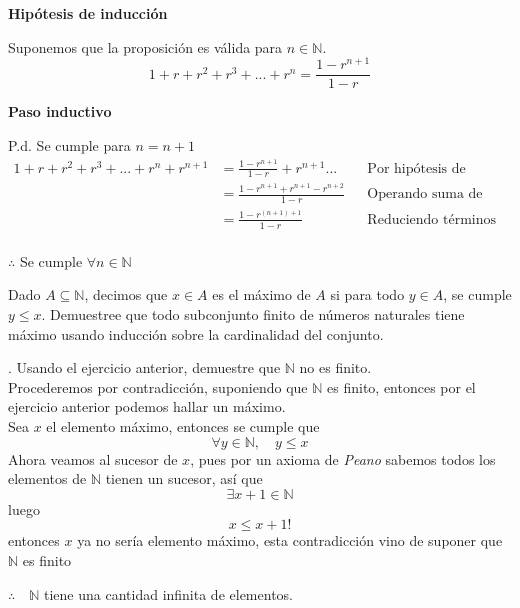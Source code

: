 \documentclass[letterpaper]{article}
\newcommand{\N}{\mathds{N}}
\renewcommand{\*}{\cdot}
\theoremstyle{definition}
\begin{document}
\begin{flushright}
	\textbf{Hipótesis de inducción}
\end{flushright}
Suponemos que la proposición es válida para $n \in \mathbb{N}.$\\
$$1+r+r^2+r^3+...+r^n=\frac{1-r^{n+1}}{1-r}$$
\begin{flushright}
\textbf{Paso inductivo}
\end{flushright}
P.d. Se cumple para $ n=n+1 $
\begin{align*}
	1+r+r^2+r^3+...+r^n+r^{n+1}&=\frac{1-r^{n+1}}{1-r}+r^{n+1}...&& \text{Por hipótesis de inducción}\\
	&=\frac{1-r^{n+1}+r^{n+1}-r^{n+2}}{1-r} &&\text{Operando suma de fracciones}\\
	&=\frac{1-r^{(n+1)+1}}{1-r} && \text{Reduciendo términos}\\
\end{align*}
\begin{center}
	$\therefore$ Se  cumple  $\forall{n} \in \mathbb{N}$\\
\end{center}



\noindent Dado $ A \subseteq \N $, decimos que $ x \in A $ es el máximo de $ A $ si para todo $ y \in A $, se cumple $ y \leq x $. Demuestree que todo subconjunto finito de números naturales tiene máximo usando inducción sobre la cardinalidad del conjunto.

. Usando el ejercicio anterior, demuestre que $ \N $ no es finito.\\

Procederemos por contradicción, suponiendo que $ \N $ es finito, entonces por el ejercicio anterior podemos hallar un máximo. \\
Sea $ x  $ el elemento máximo, entonces se cumple que $$ \forall y \in \N , \quad y \leq x $$ Ahora veamos al sucesor de $ x $, pues por un axioma de \textit{Peano} sabemos todos los elementos de $ \N $ tienen un sucesor, así que $$ \exists x + 1 \in \N $$luego $$ x \leq x+1 !$$ entonces $ x $ ya no sería elemento máximo, esta contradicción vino de suponer que $ \N $ es finito
\begin{center}
	$ \therefore \quad \N$  tiene una cantidad infinita de elementos.
\end{center}
\end{document}
